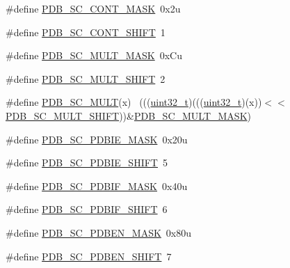 \begin{DoxyCompactItemize}
\item 
\#define \hyperlink{group___p_d_b___register___masks_gaa723ee73c65ba7680ef3c9de87b8a635}{P\+D\+B\+\_\+\+S\+C\+\_\+\+C\+O\+N\+T\+\_\+\+M\+A\+SK}~0x2u
\item 
\#define \hyperlink{group___p_d_b___register___masks_ga49a81fd7584f9957362d71ac5f4d12bb}{P\+D\+B\+\_\+\+S\+C\+\_\+\+C\+O\+N\+T\+\_\+\+S\+H\+I\+FT}~1
\item 
\#define \hyperlink{group___p_d_b___register___masks_ga86e3ec0c9f5ec6d0bbc1ebcf20774b38}{P\+D\+B\+\_\+\+S\+C\+\_\+\+M\+U\+L\+T\+\_\+\+M\+A\+SK}~0x\+Cu
\item 
\#define \hyperlink{group___p_d_b___register___masks_gaaf1dfea7eddb56850efd85b75d659ef8}{P\+D\+B\+\_\+\+S\+C\+\_\+\+M\+U\+L\+T\+\_\+\+S\+H\+I\+FT}~2
\item 
\#define \hyperlink{group___p_d_b___register___masks_ga5fe2838ee5a8eae1d02b3fc548b8a6a3}{P\+D\+B\+\_\+\+S\+C\+\_\+\+M\+U\+LT}(x)                                                  ~(((\hyperlink{_p_e___types_8h_a33594304e786b158f3fb30289278f5af}{uint32\+\_\+t})(((\hyperlink{_p_e___types_8h_a33594304e786b158f3fb30289278f5af}{uint32\+\_\+t})(x))$<$$<$\hyperlink{group___p_d_b___register___masks_gaaf1dfea7eddb56850efd85b75d659ef8}{P\+D\+B\+\_\+\+S\+C\+\_\+\+M\+U\+L\+T\+\_\+\+S\+H\+I\+FT}))\&\hyperlink{group___p_d_b___register___masks_ga86e3ec0c9f5ec6d0bbc1ebcf20774b38}{P\+D\+B\+\_\+\+S\+C\+\_\+\+M\+U\+L\+T\+\_\+\+M\+A\+SK})
\item 
\#define \hyperlink{group___p_d_b___register___masks_ga153222e454507310871a217b8ede92fd}{P\+D\+B\+\_\+\+S\+C\+\_\+\+P\+D\+B\+I\+E\+\_\+\+M\+A\+SK}~0x20u
\item 
\#define \hyperlink{group___p_d_b___register___masks_ga8632d420c92ec79e08c43f7d3acc79cf}{P\+D\+B\+\_\+\+S\+C\+\_\+\+P\+D\+B\+I\+E\+\_\+\+S\+H\+I\+FT}~5
\item 
\#define \hyperlink{group___p_d_b___register___masks_ga57cd111abf2b5780daddb6619498ef7a}{P\+D\+B\+\_\+\+S\+C\+\_\+\+P\+D\+B\+I\+F\+\_\+\+M\+A\+SK}~0x40u
\item 
\#define \hyperlink{group___p_d_b___register___masks_ga98ea01f76c8cc1bc944830d4d8387118}{P\+D\+B\+\_\+\+S\+C\+\_\+\+P\+D\+B\+I\+F\+\_\+\+S\+H\+I\+FT}~6
\item 
\#define \hyperlink{group___p_d_b___register___masks_ga5582f0b88e7ae5e9dcf69f3a859c4470}{P\+D\+B\+\_\+\+S\+C\+\_\+\+P\+D\+B\+E\+N\+\_\+\+M\+A\+SK}~0x80u
\item 
\#define \hyperlink{group___p_d_b___register___masks_ga019fc7af809a6f3945ac3c131b90432a}{P\+D\+B\+\_\+\+S\+C\+\_\+\+P\+D\+B\+E\+N\+\_\+\+S\+H\+I\+FT}~7
$$
\end{DoxyCompactItemize}
